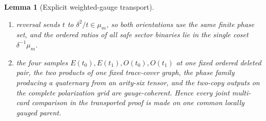 \documentclass[11pt,letterpaper,onecolumn]{article}
\theoremstyle{plain}
\newtheorem{lemma}[lemma]{Lemma}
\theoremstyle{definition}
\theoremstyle{remark}
\begin{document}
\begin{lemma}[Explicit weighted-gauge transport]
\begin{enumerate}
      trace has no forbidden phase, while an identically-zero product is a
      case of the zero-output or incomplete-support analysis, according to the other product.  Whenever
      the corresponding selected minor is
      defined, its transported value is a nonzero monomial in \(\delta,t\)
      times the standard selected determinant;
\item reversal sends \(t\) to \(\delta^2/t\in \mu_m\), so both orientations
      use the same finite phase set, and the ordered ratios of all safe sector binaries lie in the
      single coset \(\delta^{-1}\mu_m\).
\item the four samples
      \(E(t_0),E(t_1),O(t_0),O(t_1)\) at one fixed ordered deleted pair,
      the two products of one fixed trace-cover graph, the phase family
      producing a quaternary from an arity-six tensor, and the two-copy outputs on the complete polarization grid
      are gauge-coherent.  Hence every joint multi-card comparison in the
      transported proof is made on one common locally gauged parent.
\end{enumerate}
\end{lemma}
\end{document}
